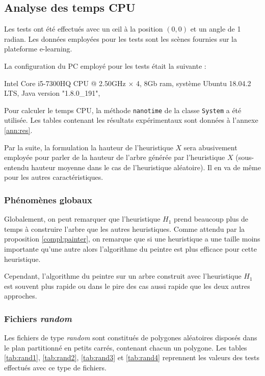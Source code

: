 \subsection{Analyse des temps CPU}
Les tests ont été effectués avec un \oe{}il à la position $(0,0)$ et un
angle de 1 radian. Les données employées pour les tests sont les scènes
fournies sur la plateforme e-learning.

La configuration du PC employé pour les tests était la suivante :

\begin{center}
  Intel Core i5-7300HQ CPU @ 2.50GHz $\times$ 4,  8Gb ram, système Ubuntu 18.04.2 LTS,
  Java version "1.8.0\_191",
\end{center}
Pour calculer le temps CPU, la méthode \texttt{nanotime} de la classe
\texttt{System} a été utilisée.
Les tables contenant les résultats expérimentaux sont données
à l'annexe \ref{ann:res}.

Par la suite, la formulation \og{}la hauteur de l'heuristique
$X$\fg{} sera abusivement employée pour parler de \og{}la hauteur
de l'arbre générée par l'heuristique $X$\fg{}
(sous-entendu hauteur moyenne dans le cas de l'heuristique aléatoire).
Il en va de même pour les autres caractéristiques.

\subsubsection*{Phénomènes globaux}
Globalement, on peut remarquer que l'heuristique $H_1$ prend beaucoup plus de
temps à construire l'arbre que les autres heuristiques.
Comme attendu par la proposition \ref{compl:painter}, on remarque
que si une heuristique a une taille moins importante qu'une autre
alors l'algorithme du peintre est plus efficace pour cette heuristique.

Cependant, l'algorithme du peintre sur un arbre construit
avec l'heuristique $H_1$ est souvent plus rapide ou dans le
pire des cas aussi rapide que les deux autres approches.

\subsubsection*{Fichiers \og\emph{random}\fg}
Les fichiers de type \og\emph{random}\fg{} sont constitués de polygones
aléatoires disposés dans le plan partitionné en petits carrés, contenant
chacun un polygone. Les tables \ref{tab:rand1}, \ref{tab:rand2},
\ref{tab:rand3} et \ref{tab:rand4} reprennent
les valeurs des tests effectués avec ce type de fichiers.

